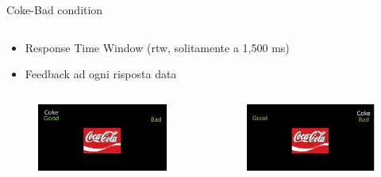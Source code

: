 \documentclass[compress]{beamer}
\begin{document}
\begin{frame}
\begin{columns}
	\begin{column}{.50\linewidth}
		\onslide<3->
		\centering
		\textcolor{blu}{Coke-Bad condition}
	\end{column}
	\end{columns}

\vspace{5mm}
\begin{itemize}
	\item Response Time Window (rtw, solitamente a 1,500 ms)
	\item Feedback ad ogni risposta data
\end{itemize}


\end{frame}

\begin{frame}
	\begin{columns}
		\centering{\textcolor{unipd}{Coke-Good}}
		\begin{figure}
			\includegraphics[width=\linewidth]{scGood.png}
		\end{figure}
		
		\centering{\textcolor{blu}{Coke-Bad}}
		\begin{figure}
			\includegraphics[width=\linewidth]{scBad.png}
		\end{figure}
	\end{columns}
	
\end{frame}
\end{document}
